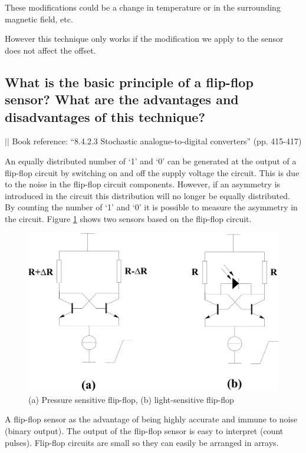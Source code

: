 \documentclass[10pt,a4paper]{article}
\newcommand{\bookref}[2]{\indent\indent\indent\indent $\vert\vert$ Book reference: ``#1'' (pp. #2) \newline}
\begin{document}
These modifications could be a change in temperature or in the surrounding magnetic field, etc.

However this technique only works if the modification we apply to the sensor does not affect the offset.

\subsection{What is the basic principle of a flip-flop sensor? What are the advantages and disadvantages of this technique?}

\bookref{8.4.2.3 Stochastic analogue-to-digital converters}{415-417}

An equally distributed number of `1' and `0' can be generated at the output of a flip-flop circuit by switching on and off the supply voltage the circuit. This is due to the noise in the  flip-flop circuit components. However, if an asymmetry is introduced in the circuit this distribution will no longer be equally distributed. By counting the number of `1' and `0' it is possible to measure the asymmetry in the circuit. Figure \ref{fig:flip-flop} shows two sensors based on the flip-flop circuit.

\begin{figure}[h!]
    \centering
    \includegraphics{flip-flop.png}
    \caption{(a) Pressure sensitive flip-flop, (b) light-sensitive flip-flop}
    \label{fig:flip-flop}
\end{figure}

A flip-flop sensor as the advantage of being highly accurate and immune to noise (binary output). The output of the flip-flop sensor is easy to interpret (count pulses). Flip-flop circuits are small so they can easily be arranged in arrays.
\end{document}
